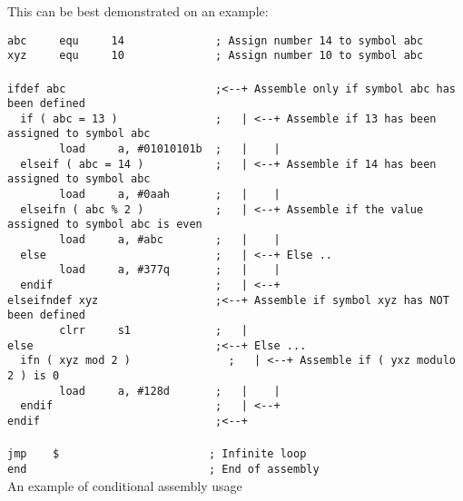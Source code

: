     This can be best demonstrated on an example:
    \begin{code}[h!]
        \mysmallfont{}
        \verb'abc     equ     14              ; Assign number 14 to symbol abc'\\
        \verb'xyz     equ     10              ; Assign number 10 to symbol abc'\\
        ~\\
        \verb'ifdef abc                       ;<--+ Assemble only if symbol abc has been defined'\\
        \verb'  if ( abc = 13 )               ;   | <--+ Assemble if 13 has been assigned to symbol abc'\\
        \verb'        load     a, #01010101b  ;   |    |'\\
        \verb'  elseif ( abc = 14 )           ;   | <--+ Assemble if 14 has been assigned to symbol abc'\\
        \verb'        load     a, #0aah       ;   |    |'\\
        \verb'  elseifn ( abc % 2 )           ;   | <--+ Assemble if the value assigned to symbol abc is even'\\
        \verb'        load     a, #abc        ;   |    |'\\
        \verb'  else                          ;   | <--+ Else ..'\\
        \verb'        load     a, #377q       ;   |    |'\\
        \verb'  endif                         ;   | <--+'\\
        \verb'elseifndef xyz                  ;<--+ Assemble if symbol xyz has NOT been defined'\\
        \verb'        clrr     s1             ;   |'\\
        \verb'else                            ;<--+ Else ...'\\
        \verb'  ifn ( xyz mod 2 )               ;   | <--+ Assemble if ( yxz modulo 2 ) is 0'\\
        \verb'        load     a, #128d       ;   |    |'\\
        \verb'  endif                         ;   | <--+'\\
        \verb'endif                           ;<--+'\\
        ~\\
        \verb'jmp    $                       ; Infinite loop'\\
        \verb'end                            ; End of assembly'\\
        \caption{An example of conditional assembly usage}
    \end{code}

